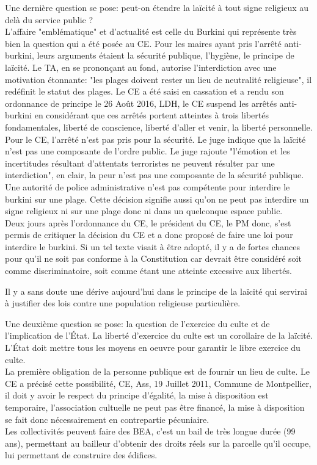 \documentclass[10pt, a4paper, openany]{book}
\begin{document}
Une dernière question se pose: peut-on étendre la laïcité à tout signe religieux au delà du service public ? \\
L'affaire "emblématique" et d'actualité est celle du Burkini qui représente très bien la question qui a été posée au CE. Pour les maires ayant pris l'arrêté anti-burkini, leurs arguments étaient la sécurité publique, l'hygiène, le principe de laïcité. Le TA, en se prononçant au fond, autorise l'interdiction avec une motivation étonnante: "les plages doivent rester un lieu de neutralité religieuse", il redéfinit le statut des plages. Le CE a été saisi en cassation et a rendu son ordonnance de principe le 26 Août 2016, LDH, le CE suspend les arrêtés anti-burkini en considérant que ces arrêtés portent atteintes à trois libertés fondamentales, liberté de conscience, liberté d'aller et venir, la liberté personnelle. Pour le CE, l'arrêté n'est pas pris pour la sécurité. Le juge indique que la laïcité n'est pas une composante de l'ordre public. Le juge rajoute "l'émotion et les incertitudes résultant d'attentats terroristes ne peuvent résulter par une interdiction", en clair, la peur n'est pas une composante de la sécurité publique. \\
Une autorité de police administrative n'est pas compétente pour interdire le burkini sur une plage. Cette décision signifie aussi qu'on ne peut pas interdire un signe religieux ni sur une plage donc ni dans un quelconque espace public. \\
Deux jours après l'ordonnance du CE, le président du CE, le PM donc, s'est permis de critiquer la décision du CE et a donc proposé de faire une loi pour interdire le burkini. Si un tel texte visait à être adopté, il y a de fortes chances pour qu'il ne soit pas conforme à la Constitution car devrait être considéré soit comme discriminatoire, soit comme étant une atteinte excessive aux libertés. 


Il y a sans doute une dérive aujourd'hui dans le principe de la laïcité qui servirai à justifier des lois contre une population religieuse particulière.


Une deuxième question se pose: la question de l'exercice du culte et de l'implication de l'État. La liberté d'exercice du culte est un corollaire de la laïcité. L'État doit mettre tous les moyens en oeuvre pour garantir le libre exercice du culte. \\
La première obligation de la personne publique est de fournir un lieu de culte. Le CE a précisé cette possibilité, CE, Ass, 19 Juillet 2011, Commune de Montpellier, il doit y avoir le respect du principe d'égalité, la mise à disposition est temporaire, l'association cultuelle ne peut pas être financé, la mise à disposition se fait donc nécessairement en contrepartie pécuniaire. \\
Les collectivités peuvent faire des BEA, c'est un bail de très longue durée (99 ans), permettant au bailleur d'obtenir des droits réels sur la parcelle qu'il occupe, lui permettant de construire des édifices.
\end{document}
